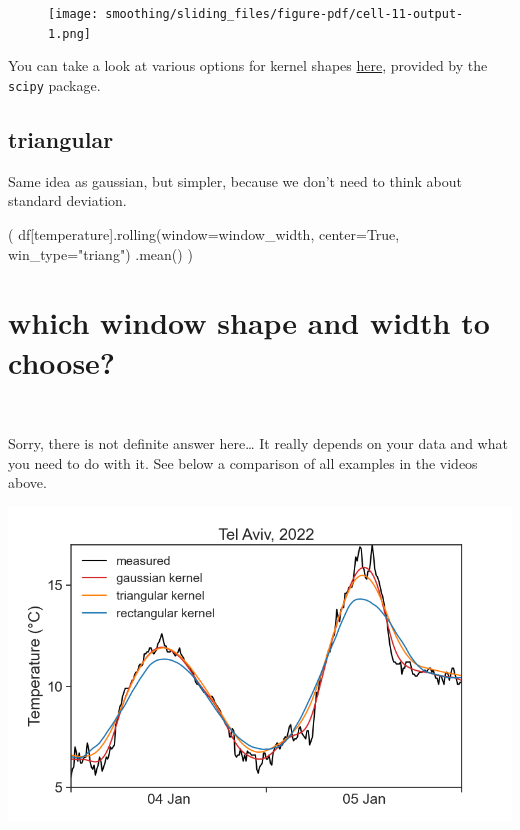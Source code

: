 \documentclass[
  letterpaper,
  DIV=11,
  numbers=noendperiod,
  oneside]{scrreprt}
\newenvironment{Shaded}{\begin{snugshade}}{\end{snugshade}}
\newcommand{\NormalTok}[1]{\textcolor[rgb]{0.00,0.23,0.31}{#1}}
\newcommand{\OperatorTok}[1]{\textcolor[rgb]{0.37,0.37,0.37}{#1}}
\newcommand{\StringTok}[1]{\textcolor[rgb]{0.13,0.47,0.30}{#1}}
\newcommand{\VariableTok}[1]{\textcolor[rgb]{0.07,0.07,0.07}{#1}}
\begin{document}
\begin{figure}[H]

{\centering \texttt{[image: smoothing/sliding\_files/figure-pdf/cell-11-output-1.png]}

}

\end{figure}

You can take a look at various options for kernel shapes
\href{https://docs.scipy.org/doc/scipy/reference/signal.windows.html\#module-scipy.signal.windows}{here},
provided by the \texttt{scipy} package.

\hypertarget{triangular}{%
\subsection{triangular}\label{triangular}}

Same idea as gaussian, but simpler, because we don't need to think about
standard deviation.

\begin{Shaded}
\begin{Highlighting}[]
\NormalTok{(}
\NormalTok{df[}\StringTok{\textquotesingle{}temperature\textquotesingle{}}\NormalTok{].rolling(window}\OperatorTok{=}\NormalTok{window\_width,}
\NormalTok{                          center}\OperatorTok{=}\VariableTok{True}\NormalTok{,}
\NormalTok{                          win\_type}\OperatorTok{=}\StringTok{"triang"}\NormalTok{)}
\NormalTok{                 .mean()}
\NormalTok{)}
\end{Highlighting}
\end{Shaded}

\hypertarget{which-window-shape-and-width-to-choose}{%
\section{which window shape and width to
choose?}\label{which-window-shape-and-width-to-choose}}

🤷‍♂️

Sorry, there is not definite answer here\ldots{} It really depends on
your data and what you need to do with it. See below a comparison of all
examples in the videos above.

\includegraphics{smoothing/kernel_comparison.png}
\end{document}

